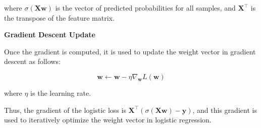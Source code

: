 where \( \sigma(\mathbf{Xw}) \) is the vector of predicted probabilities for all samples, and \( \mathbf{X}^\top \) is the transpose of the feature matrix.

\textbf{Gradient Descent Update}

Once the gradient is computed, it is used to update the weight vector in gradient descent as follows:

\[
\mathbf{w} \leftarrow \mathbf{w} - \eta \nabla_{\mathbf{w}} L(\mathbf{w})
\]

where \( \eta \) is the learning rate.

Thus, the gradient of the logistic loss is \( \mathbf{X}^\top (\sigma(\mathbf{Xw}) - \mathbf{y}) \), and this gradient is used to iteratively optimize the weight vector in logistic regression.
